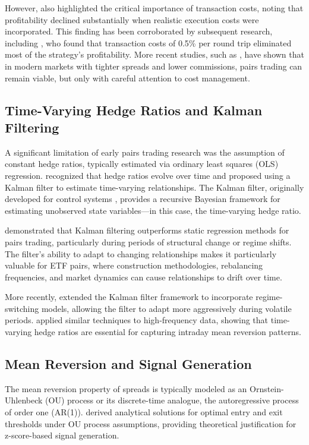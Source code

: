\documentclass[12pt]{article}
\begin{document}
However, \citet{gatev2006pairs} also highlighted the critical importance of transaction costs, noting that profitability declined substantially when realistic execution costs were incorporated. This finding has been corroborated by subsequent research, including \citet{do2006pairs}, who found that transaction costs of 0.5\% per round trip eliminated most of the strategy's profitability. More recent studies, such as \citet{rad2016pairs}, have shown that in modern markets with tighter spreads and lower commissions, pairs trading can remain viable, but only with careful attention to cost management.

\subsection{Time-Varying Hedge Ratios and Kalman Filtering}

A significant limitation of early pairs trading research was the assumption of constant hedge ratios, typically estimated via ordinary least squares (OLS) regression. \citet{elliott2005pairs} recognized that hedge ratios evolve over time and proposed using a Kalman filter to estimate time-varying relationships. The Kalman filter, originally developed for control systems \citep{kalman1960new}, provides a recursive Bayesian framework for estimating unobserved state variables—in this case, the time-varying hedge ratio.

\citet{triantafyllopoulos2007state} demonstrated that Kalman filtering outperforms static regression methods for pairs trading, particularly during periods of structural change or regime shifts. The filter's ability to adapt to changing relationships makes it particularly valuable for ETF pairs, where construction methodologies, rebalancing frequencies, and market dynamics can cause relationships to drift over time.

More recently, \citet{miao2017pairs} extended the Kalman filter framework to incorporate regime-switching models, allowing the filter to adapt more aggressively during volatile periods. \citet{avellaneda2010statistical} applied similar techniques to high-frequency data, showing that time-varying hedge ratios are essential for capturing intraday mean reversion patterns.

\subsection{Mean Reversion and Signal Generation}

The mean reversion property of spreads is typically modeled as an Ornstein-Uhlenbeck (OU) process or its discrete-time analogue, the autoregressive process of order one (AR(1)). \citet{bertram2010analytical} derived analytical solutions for optimal entry and exit thresholds under OU process assumptions, providing theoretical justification for z-score-based signal generation.
\end{document}
